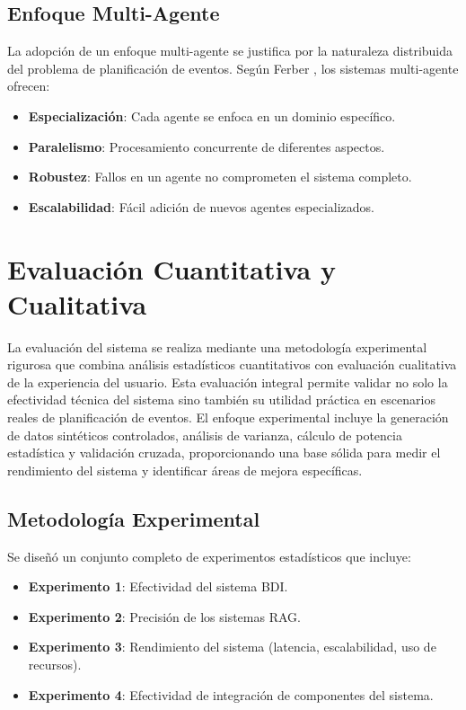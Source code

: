 \documentclass[runningheads,a4paper]{llncs}
\begin{document}
\subsection{Enfoque Multi-Agente}

La adopción de un enfoque multi-agente se justifica por la naturaleza distribuida del problema de planificación de eventos. 
Según Ferber \cite{ferber1999multi}, los sistemas multi-agente ofrecen:

\begin{itemize}
    \item \textbf{Especialización}: Cada agente se enfoca en un dominio específico.
    \item \textbf{Paralelismo}: Procesamiento concurrente de diferentes aspectos.
    \item \textbf{Robustez}: Fallos en un agente no comprometen el sistema completo.
    \item \textbf{Escalabilidad}: Fácil adición de nuevos agentes especializados.
\end{itemize}

\section{Evaluación Cuantitativa y Cualitativa}

La evaluación del sistema se realiza mediante una metodología experimental rigurosa que combina análisis estadísticos 
cuantitativos con evaluación cualitativa de la experiencia del usuario. Esta evaluación integral permite validar no solo la 
efectividad técnica del sistema sino también su utilidad práctica en escenarios reales de planificación de eventos. El enfoque 
experimental incluye la generación de datos sintéticos controlados, análisis de varianza, cálculo de potencia estadística y 
validación cruzada, proporcionando una base sólida para medir el rendimiento del sistema y identificar áreas de mejora 
específicas.

\subsection{Metodología Experimental}

Se diseñó un conjunto completo de experimentos estadísticos que incluye:

\begin{itemize}
    \item \textbf{Experimento 1}: Efectividad del sistema BDI.
    \item \textbf{Experimento 2}: Precisión de los sistemas RAG.
    \item \textbf{Experimento 3}: Rendimiento del sistema (latencia, escalabilidad, uso de recursos).
    \item \textbf{Experimento 4}: Efectividad de integración de componentes del sistema.
\end{itemize}
\end{document}
